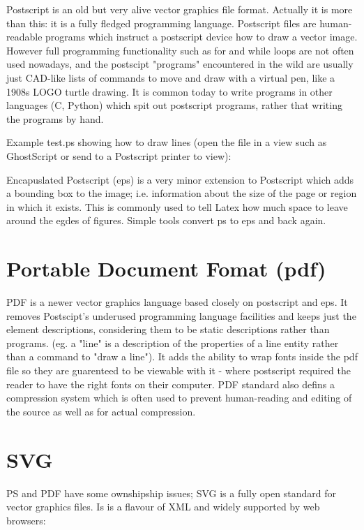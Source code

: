 \documentclass[oneside,english]{scrbook}
\begin{document}
Postscript is an old but very alive vector graphics file format. Actually it is more than this: it is a fully fledged programming language.   Postscript files are human-readable programs which instruct a postscript device how to draw a vector image.  However full programming functionality such as for and while loops are not often used nowadays, and the postscipt "programs" encountered in the wild are usually just CAD-like lists of commands to move and draw with a virtual pen, like a 1908s LOGO turtle drawing.  It is common today to write programs in other languages (C, Python) which spit out postscript programs, rather that writing the programs by hand.

Example test.ps showing how to draw lines (open the file in a view such as GhostScript or send to a Postscript printer to view):


Encapuslated Postscript (eps) is a very minor extension to Postscript which adds a bounding box to the image; i.e. information about the size of the page or region in which it exists. This is commonly used to tell Latex how much space to leave around the egdes of figures. Simple tools convert ps to eps and back again.


\section{Portable Document Fomat (pdf)}

PDF is a newer vector graphics language based closely on postscript and eps.  It removes Postscipt's underused programming language facilities and keeps just the element descriptions, considering them to be static descriptions rather than programs.  (eg. a "line" is a description of the properties of a line entity rather than a command to "draw a line").  It adds the ability to wrap fonts inside the pdf file so they are guarenteed to be viewable with it - where postscript required the reader to have the right fonts on their computer.  PDF standard also defins a compression system which is often used to prevent human-reading and editing of the source as well as for actual compression.




\section{SVG}
PS and PDF have some ownshipship issues; SVG is a fully open standard for vector graphics files. Is is a flavour of XML and widely supported by web browsers:
\end{document}
